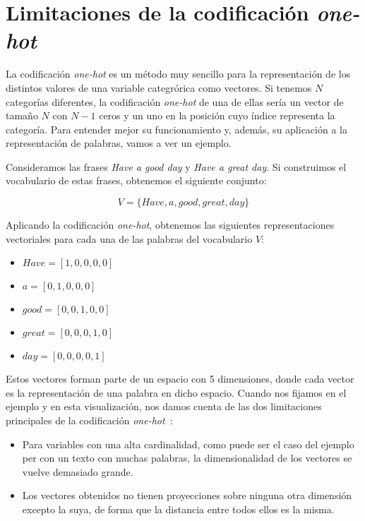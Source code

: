 \section{Limitaciones de la codificación \textit{one-hot}}
\label{sec:one-hot-limitations}

La codificación \textit{one-hot} es un método muy sencillo para la
representación de los distintos valores de una variable categrórica como
vectores. Si tenemos $N$ categorías diferentes, la codificación \textit{one-hot}
de una de ellas sería un vector de tamaño $N$ con $N-1$ ceros y un uno en la
posición cuyo índice representa la categoría. Para entender mejor su
funcionamiento y, además, su aplicación a la representación de palabras, vamos a
ver un ejemplo.

Consideramos las frases \textit{Have a good day} y \textit{Have a great day}. Si
construimos el vocabulario de estas frases, obtenemos el siguiente conjunto:

\begin{equation}
    V = \{Have, a, good, great, day\}
\end{equation}

Aplicando la codificación \textit{one-hot}, obtenemos las siguientes
representaciones vectoriales para cada una de las palabras del vocabulario $V$:

\begin{itemize}
    \item $Have = [1, 0, 0, 0, 0]$
    \item $a = [0, 1, 0, 0, 0]$
    \item $good = [0, 0, 1, 0, 0]$
    \item $great = [0, 0, 0, 1, 0]$
    \item $day = [0, 0, 0, 0, 1]$
\end{itemize}

Estos vectores forman parte de un espacio con 5 dimensiones, donde cada vector
es la representación de una palabra en dicho espacio. Cuando nos fijamos en
el ejemplo y en esta visualización, nos damos cuenta de las dos limitaciones
principales de la codificación \textit{one-hot}~\cite{one-hot}:

\begin{itemize}
    \item Para variables con una alta cardinalidad, como puede ser el caso del
          ejemplo per con un texto con muchas palabras, la dimensionalidad de los
          vectores se vuelve demasiado grande.
    \item Los vectores obtenidos no tienen proyecciones sobre ninguna otra
          dimensión excepto la suya, de forma que la distancia entre todos ellos es la
          misma.
\end{itemize}

